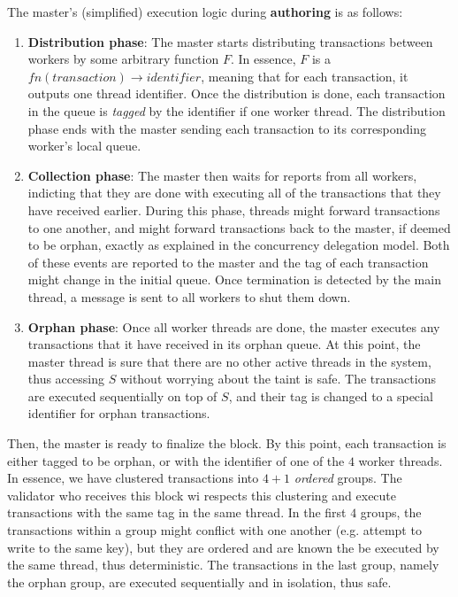The master's (simplified) execution logic during \textbf{authoring} is as follows:

\begin{enumerate}
	\item \textbf{Distribution phase}: The master starts distributing transactions between workers
	by some arbitrary function $F$. In essence, $F$ is a $fn(transaction) \rightarrow identifier$,
	meaning that for each transaction, it outputs one thread identifier. Once the distribution is
	done, each transaction in the queue is \textit{tagged} by the identifier if one worker thread.
	The distribution phase ends with the master sending each transaction to its corresponding
	worker's local queue.

	\item \textbf{Collection phase}: The master then waits for reports from all workers,
	indicting that they are done with executing all of the transactions that they have received
	earlier. During this phase, threads might forward transactions to one another, and might forward
	transactions back to the master, if deemed to be orphan, exactly as explained in the concurrency
	delegation model. Both of these events are reported to the master and the tag of each
	transaction might change in the initial queue. Once termination is detected by the main thread,
	a message is sent to all workers to shut them down.

	\item \textbf{Orphan phase}: Once all worker threads are done, the master executes any
	transactions that it have received in its orphan queue. At this point, the master thread is sure
	that there are no other active threads in the system, thus accessing $S$ without worrying about
	the taint is safe. The transactions are executed sequentially on top of $S$, and their tag is
	changed to a special identifier for orphan transactions.
\end{enumerate}

Then, the master is ready to finalize the block. By this point, each transaction is either tagged to
be orphan, or with the identifier of one of the $4$ worker threads. In essence, we have clustered
transactions into $4 + 1$ \textit{ordered} groups. The validator who receives this block wi
respects this clustering and execute transactions with the same tag in the same thread. In the first
$4$ groups, the transactions within a group might conflict with one another (e.g. attempt to write
to the same key), but they are ordered and are known the be executed by the same thread, thus
deterministic. The transactions in the last group, namely the orphan group, are executed
sequentially and in isolation, thus safe.

